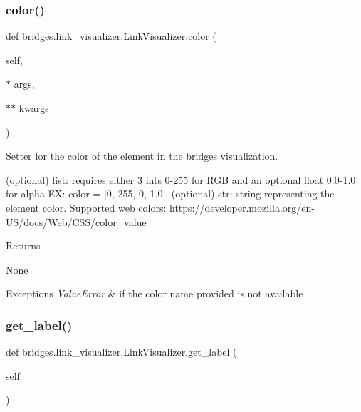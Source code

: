 \subsubsection{\texorpdfstring{color()}{color()}\hspace{0.1cm}{\footnotesize\ttfamily [2/2]}}
{\footnotesize\ttfamily def bridges.\+link\+\_\+visualizer.\+Link\+Visualizer.\+color (\begin{DoxyParamCaption}\item[{}]{self,  }\item[{$\ast$}]{args,  }\item[{$\ast$$\ast$}]{kwargs }\end{DoxyParamCaption})}



Setter for the color of the element in the bridges visualization. 

\begin{DoxyVerb}       (optional) list: requires either 3 ints 0-255 for RGB and an optional
       float 0.0-1.0 for alpha EX: color = [0, 255, 0, 1.0].
       (optional) str: string representing the element color. Supported web colors:
       https://developer.mozilla.org/en-US/docs/Web/CSS/color_value
\end{DoxyVerb}
 \begin{DoxyReturn}{Returns}


None
\end{DoxyReturn}

\begin{DoxyExceptions}{Exceptions}
{\em Value\+Error} & if the color name provided is not available \\
\hline
\end{DoxyExceptions}
\mbox{\label{classbridges_1_1link__visualizer_1_1_link_visualizer_a36268a1bc712fb42f4401846e70536e6}} 
\subsubsection{\texorpdfstring{get\_label()}{get\_label()}}
{\footnotesize\ttfamily def bridges.\+link\+\_\+visualizer.\+Link\+Visualizer.\+get\+\_\+label (\begin{DoxyParamCaption}\item[{}]{self }\end{DoxyParamCaption})}



